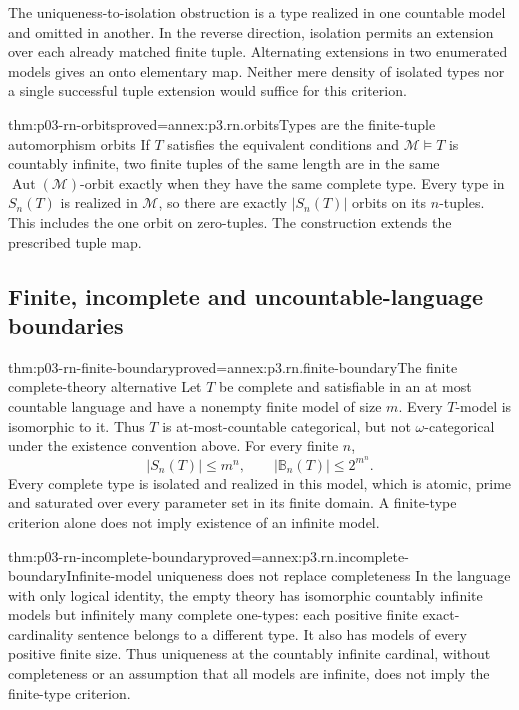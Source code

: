 The uniqueness-to-isolation obstruction is a type realized
in one countable model and omitted in another. In the reverse
direction, isolation permits an extension over each already
matched finite tuple. Alternating extensions in two enumerated
models gives an onto elementary map. Neither mere density
of isolated types nor a single successful tuple extension
would suffice for this criterion.

\begin{hbcorollary}{thm:p03-rn-orbits}{proved=annex:p3.rn.orbits}{Types are the finite-tuple automorphism orbits}
If \(T\) satisfies the equivalent conditions and
\(\mathcal M\models T\) is countably infinite, two finite
tuples of the same length are in the same
\(\operatorname{Aut}(\mathcal M)\)-orbit exactly when
they have the same complete type.
Every type in \(S_n(T)\) is realized in \(\mathcal M\),
so there are exactly \(|S_n(T)|\) orbits on its \(n\)-tuples.
This includes the one orbit on zero-tuples.
The construction extends the prescribed tuple map.
\end{hbcorollary}

\subsection{Finite, incomplete and uncountable-language boundaries}
\label{sec:p03-rn-boundaries}

\begin{hbtheorem}{thm:p03-rn-finite-boundary}{proved=annex:p3.rn.finite-boundary}{The finite complete-theory alternative}
Let \(T\) be complete and satisfiable in an at most countable
language and have a nonempty finite model of size \(m\).
Every \(T\)-model is isomorphic to it.
Thus \(T\) is at-most-countable categorical, but not
\(\omega\)-categorical under the existence convention above.
For every finite \(n\),
\[
 |S_n(T)|\leq m^n,\qquad
 |\mathbb B_n(T)|\leq2^{m^n}.
\]
Every complete type is isolated and realized in this model,
which is atomic, prime and saturated over every parameter
set in its finite domain. A finite-type criterion alone
does not imply existence of an infinite model.
\end{hbtheorem}

\begin{hbtheorem}{thm:p03-rn-incomplete-boundary}{proved=annex:p3.rn.incomplete-boundary}{Infinite-model uniqueness does not replace completeness}
In the language with only logical identity, the empty theory
has isomorphic countably infinite models but infinitely many
complete one-types: each positive finite exact-cardinality
sentence belongs to a different type.
It also has models of every positive finite size.
Thus uniqueness at the countably infinite cardinal, without
completeness or an assumption that all models are infinite,
does not imply the finite-type criterion.
\end{hbtheorem}

